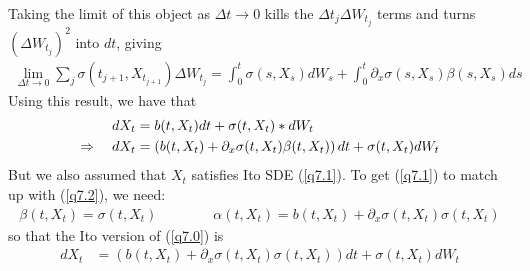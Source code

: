 \documentclass[12pt]{article}
\theoremstyle{plain}
\theoremstyle{definition}
\theoremstyle{remark}
\begin{document}
\begin{enumerate}
    Taking the limit of this object as $\Delta t \rightarrow 0$ kills
    the $\Delta t_j \Delta W_{t_j}$ terms and turns $(\Delta W_{t_j})^2$
    into $dt$, giving
    \begin{align*}
      \lim_{\Delta t \rightarrow 0}
      \sum_j \sigma(t_{j+1},X_{t_{j+1}}) \Delta W_{t_j}
      =
      \int^t_0 \sigma(s,X_{s}) dW_s
      + \int^t_0 \partial_x \sigma(s,X_{s})\beta(s , X_{s})ds
    \end{align*}
    Using this result, we have that
    \begin{align}
      dX_t &= b(t,X_t) dt + \sigma(t,X_t) * dW_t \notag \\
      \Rightarrow\quad
      dX_t &= \left(b(t,X_t) +\partial_x \sigma(t,X_t) \beta(t,X_t)\right)dt + \sigma(t,X_t) dW_t
      \label{q7.2}
    \end{align}
    But we also assumed that $X_t$ satisfies Ito SDE (\ref{q7.1}). To
    get (\ref{q7.1}) to match up with (\ref{q7.2}), we need:
    \begin{align*}
      \beta(t,X_t) = \sigma(t,X_t) \qquad\qquad
      \alpha(t,X_t) = b(t,X_t) + \partial_x \sigma(t,X_t)\sigma(t,X_t)
    \end{align*}
    so that the Ito version of (\ref{q7.0}) is
    \begin{align*}
      dX_t &= \left(b(t,X_t) +\partial_x \sigma(t,X_t) \sigma(t,X_t)\right)dt + \sigma(t,X_t) dW_t
    \end{align*}




\end{enumerate}
\end{document}
